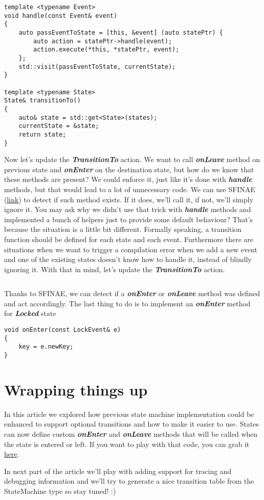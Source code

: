 \documentclass{article}[8pt]
\newcommand{\code}[1]{\textbf{\textit{#1}}}
\newcommand{\locked}{\code{Locked}}
\begin{document}
\bigskip
\begin{verbatim}
template <typename Event>
void handle(const Event& event)
{
	auto passEventToState = [this, &event] (auto statePtr) {
		auto action = statePtr->handle(event);
		action.execute(*this, *statePtr, event);
	};
	std::visit(passEventToState, currentState);
}

template <typename State>
State& transitionTo()
{
	auto& state = std::get<State>(states);
	currentState = &state;
	return state;
}
\end{verbatim}
\bigskip

Now let's update the \code{TransitionTo} action. We want to call \code{onLeave} method on previous state and \code{onEnter} on the destination state, but how do we know that these methods are present? We could enforce it, just like it's done with \code{handle} methods, but that would lead to a lot of unnecessary code. We can use SFINAE (\href{https://en.cppreference.com/w/cpp/language/sfinae}{link}) to detect if such method exists. If it does, we'll call it, if not, we'll simply ignore it. You may ask why we didn't use that trick with \code{handle} methods and implemented a bunch of helpers just to provide some default behaviour? That's because the situation is a little bit different. Formally speaking, a transition function should be defined for each state and each event. Furthermore there are situations when we want to trigger a compilation error when we add a new event and one of the existing states doesn't know how to handle it, instead of blindly ignoring it. With that in mind, let's update the \code{TransitionTo} action.

\bigskip
\inputminted[firstline=3]{c++}{../fsm/actions/TransitionTo.h}
\bigskip

Thanks to SFINAE, we can detect if a \code{onEnter} or \code{onLeave} method was defined and act accordingly. The last thing to do is to implement an \code{onEnter} method for \locked{} state

\bigskip
\begin{verbatim}
void onEnter(const LockEvent& e)
{
	key = e.newKey;
}
\end{verbatim}
\bigskip

\section*{Wrapping things up}
In this article we explored how previous state machine implementation could be enhanced to support optional transitions and how to make it easier to use. States can now define custom \code{onEnter} and \code{onLeave} methods that will be called when the state is entered or left. If you want to play with that code, you can grab it \href{https://github.com/AdamsPL/state-machine}{here}.

In next part of the article we'll play with adding support for tracing and debugging information and we'll try to generate a nice transition table from the StateMachine type so stay tuned! :)
\end{document}
